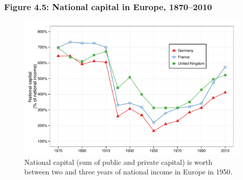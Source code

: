 \documentclass[t]{beamer}\usepackage[]{graphicx}\usepackage[]{color}
\newenvironment{knitrout}{}{} %
\begin{document}
\begin{frame}[label=Figure_4_5]
\frametitle{Figure 4.5: National capital in Europe, 1870--2010}
\begin{figure}[t]
\begin{minipage}[b]{\textwidth}
\centering
\begin{knitrout}\footnotesize
{}\color{fgcolor}

{\centering \includegraphics[width=1\linewidth]{figures/color/Figure_4_5} 

}



\end{knitrout}
\caption{National capital (sum of public and private capital) is worth between two and three years of national income in Europe in 1950.}
\end{minipage}
\end{figure}
\end{frame}
\end{document}
